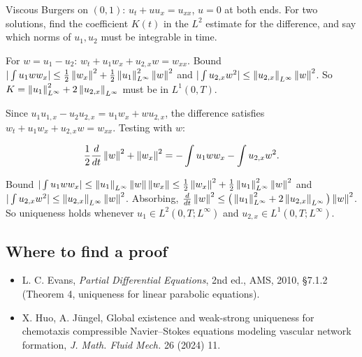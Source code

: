 \begin{exercise}
  Viscous Burgers on $(0,1)$: $u_t + uu_x = u_{xx}$, $u = 0$ at both ends. For two solutions, find the coefficient $K(t)$ in the $L^2$ estimate for the difference, and say which norms of $u_1, u_2$ must be integrable in time.
  \begin{hint}
    For $w = u_1 - u_2$: $w_t + u_1w_x + u_{2,x}w = w_{xx}$. Bound $|\int u_1ww_x| \le \frac12\left\lVert w_x\right\rVert^2 + \frac12\left\lVert u_1\right\rVert_{L^\infty}^2\left\lVert w\right\rVert^2$ and $|\int u_{2,x}w^2| \le \left\lVert u_{2,x}\right\rVert_{L^\infty}\left\lVert w\right\rVert^2$. So $K = \left\lVert u_1\right\rVert_{L^\infty}^2 + 2\left\lVert u_{2,x}\right\rVert_{L^\infty}$ must be in $L^1(0,T)$.
  \end{hint}
  \begin{solution}
    Since $u_1u_{1,x} - u_2u_{2,x} = u_1w_x + wu_{2,x}$, the difference satisfies $w_t + u_1w_x + u_{2,x}w = w_{xx}$. Testing with $w$:

    \[ \frac12\frac{d}{dt}\left\lVert w\right\rVert^2 + \left\lVert w_x\right\rVert^2 = -\int u_1ww_x - \int u_{2,x}w^2. \]

    Bound $|\int u_1ww_x| \le \left\lVert u_1\right\rVert_{L^\infty}\left\lVert w\right\rVert\left\lVert w_x\right\rVert \le \frac12\left\lVert w_x\right\rVert^2 + \frac12\left\lVert u_1\right\rVert_{L^\infty}^2\left\lVert w\right\rVert^2$ and $|\int u_{2,x}w^2| \le \left\lVert u_{2,x}\right\rVert_{L^\infty}\left\lVert w\right\rVert^2$. Absorbing, $\frac{d}{dt}\left\lVert w\right\rVert^2 \le \big(\left\lVert u_1\right\rVert_{L^\infty}^2 + 2\left\lVert u_{2,x}\right\rVert_{L^\infty}\big)\left\lVert w\right\rVert^2$. So uniqueness holds whenever $u_1 \in L^2(0,T;L^\infty)$ and $u_{2,x} \in L^1(0,T;L^\infty)$.
  \end{solution}
\end{exercise}

\subsection*{Where to find a proof}

\begin{itemize}
\item L. C. Evans, \emph{Partial Differential Equations}, 2nd ed., AMS, 2010, §7.1.2 (Theorem 4, uniqueness for linear parabolic equations).
\item X. Huo, A. Jüngel, Global existence and weak-strong uniqueness for chemotaxis compressible Navier--Stokes equations modeling vascular network formation, \emph{J. Math. Fluid Mech.} 26 (2024) 11.
\end{itemize}

\neededfor
